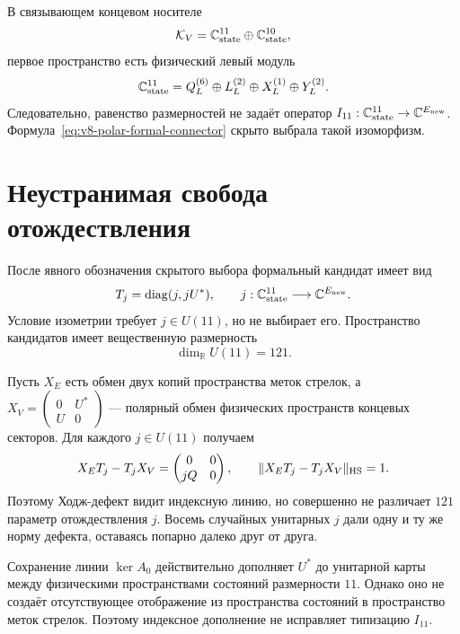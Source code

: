 В связывающем концевом носителе
\begin{equation}
 \mathcal K_V=\mathbb C^{11}_{\rm state}\oplus\mathbb C^{10}_{\rm state},
\end{equation}
первое пространство есть физический левый модуль
\begin{equation}
 \mathbb C^{11}_{\rm state}
 =Q_L^{(6)}\oplus L_L^{(2)}\oplus X_L^{(1)}\oplus Y_L^{(2)}.
 \label{eq:v8-polar-left-state-space}
\end{equation}
Следовательно, равенство размерностей не задаёт оператор
$I_{11}:\mathbb C^{11}_{\rm state}\to\mathbb C^{E_{\rm new}}$.
Формула~\eqref{eq:v8-polar-formal-connector} скрыто выбрала такой
изоморфизм.

\section{Неустранимая свобода отождествления}

После явного обозначения скрытого выбора формальный кандидат имеет вид
\begin{equation}
 T_j=\operatorname{diag}(j,jU^*),
 \qquad
 j:\mathbb C^{11}_{\rm state}\longrightarrow
       \mathbb C^{E_{\rm new}}.
 \label{eq:v8-polar-j-family}
\end{equation}
Условие изометрии требует $j\in U(11)$, но не выбирает его. Пространство
кандидатов имеет вещественную размерность
\begin{equation}
 \dim_{\mathbb R}U(11)=121.
\end{equation}

Пусть $X_E$ есть обмен двух копий пространства меток стрелок, а
$X_V=\left(\begin{smallmatrix}0&U^*\\U&0\end{smallmatrix}\right)$ ---
полярный обмен физических пространств концевых секторов. Для каждого $j\in U(11)$
получаем
\begin{equation}
 X_ET_j-T_jX_V
 =\begin{pmatrix}0&0\\jQ&0\end{pmatrix},
 \qquad
 \|X_ET_j-T_jX_V\|_{\rm HS}=1.
 \label{eq:v8-polar-j-independent-defect}
\end{equation}
Поэтому Ходж-дефект видит индексную линию, но совершенно не различает
$121$ параметр отождествления $j$. Восемь случайных унитарных $j$ дали одну
и ту же норму дефекта, оставаясь попарно далеко друг от друга.

Сохранение линии $\ker A_0$ действительно дополняет $U^*$ до унитарной
карты между физическими пространствами состояний размерности $11$. Однако оно
не создаёт отсутствующее отображение из пространства состояний в пространство
меток стрелок. Поэтому индексное дополнение не исправляет типизацию
$I_{11}$.

